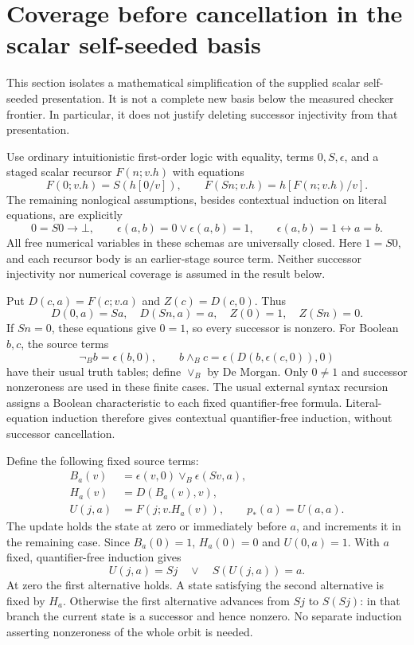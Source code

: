 \section{Coverage before cancellation in the scalar self-seeded basis}
\label{sec:coverage-no-cancellation}

This section isolates a mathematical simplification of the supplied
scalar self-seeded presentation. It is not a complete new basis below
the measured checker frontier. In particular, it does not justify
deleting successor injectivity from that presentation.

Use ordinary intuitionistic first-order logic with equality, terms
$0,S,\epsilon$, and a staged scalar recursor $F(n;v.h)$ with equations
\[
 F(0;v.h)=S(h[0/v]),\qquad
 F(Sn;v.h)=h[F(n;v.h)/v].
\]
The remaining nonlogical assumptions, besides contextual induction on
literal equations, are explicitly
\[
 0=S0\to\bot,\qquad
 \epsilon(a,b)=0\lor\epsilon(a,b)=1,\qquad
 \epsilon(a,b)=1\leftrightarrow a=b.
\]
All free numerical variables in these schemas are universally closed. Here $1=S0$, and each recursor body is an earlier-stage
source term. Neither successor injectivity nor numerical coverage is
assumed in the result below.

Put $D(c,a)=F(c;v.a)$ and $Z(c)=D(c,0)$. Thus
\[
 D(0,a)=Sa,\quad D(Sn,a)=a,\quad Z(0)=1,\quad Z(Sn)=0.
\]
If $Sn=0$, these equations give $0=1$, so every successor is nonzero.
For Boolean $b,c$, the source terms
\[
 \neg_Bb=\epsilon(b,0),\qquad
 b\wedge_Bc=\epsilon(D(b,\epsilon(c,0)),0)
\]
have their usual truth tables; define $\vee_B$ by De Morgan. Only
$0\ne1$ and successor nonzeroness are used in these finite cases.
The usual external syntax recursion assigns a Boolean characteristic
to each fixed quantifier-free formula. Literal-equation induction
therefore gives contextual quantifier-free induction, without
successor cancellation.

Define the following fixed source terms:
\[
 \begin{split}
 B_a(v)&=\epsilon(v,0)\vee_B\epsilon(Sv,a),\\
 H_a(v)&=D(B_a(v),v),\\
 U(j,a)&=F(j;v.H_a(v)),\qquad p_*(a)=U(a,a).
 \end{split}
\]
The update holds the state at zero or immediately before $a$, and
increments it in the remaining case. Since $B_a(0)=1$,
$H_a(0)=0$ and $U(0,a)=1$. With $a$ fixed, quantifier-free induction gives
\begin{equation}
 U(j,a)=Sj\quad\lor\quad S(U(j,a))=a.
 \label{eq:protected-orbit}
\end{equation}
At zero the first alternative holds. A state satisfying the second
alternative is fixed by $H_a$. Otherwise the first alternative advances
from $Sj$ to $S(Sj)$: in that branch the current state is a successor
and hence nonzero. No separate induction asserting nonzeroness of the
whole orbit is needed.

